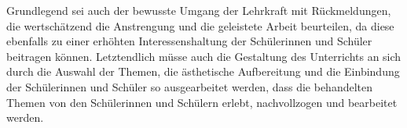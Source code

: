 Grundlegend sei auch der bewusste Umgang der Lehrkraft mit \glqq Rückmeldungen, die wertschätzend die Anstrengung und die geleistete Arbeit beurteilen\grqq{}\cite[S.\,25]{GDS13}, da diese ebenfalls zu einer erhöhten Interessenshaltung der Schülerinnen und Schüler beitragen können. 
Letztendlich müsse auch die Gestaltung des Unterrichts an sich durch die Auswahl der Themen, die ästhetische Aufbereitung und die Einbindung der Schülerinnen und Schüler so ausgearbeitet werden, dass die behandelten Themen \glqq von den Schülerinnen und Schülern erlebt, nachvollzogen und bearbeitet werden\grqq{}\cite[S.\,25]{GDS13}.






